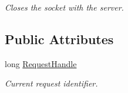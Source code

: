 \begin{DoxyCompactItemize}
\begin{DoxyCompactList}\small\item\em Closes the socket with the server. \end{DoxyCompactList}\end{DoxyCompactItemize}
\subsection*{Public Attributes}
\begin{DoxyCompactItemize}
\item 
\hypertarget{classTcpClient_a57ffabce89de6e0f07a3717758f67fe6}{long \hyperlink{classTcpClient_a57ffabce89de6e0f07a3717758f67fe6}{Request\-Handle}}\label{classTcpClient_a57ffabce89de6e0f07a3717758f67fe6}

\begin{DoxyCompactList}\small\item\em Current request identifier. \end{DoxyCompactList}\end{DoxyCompactItemize}
